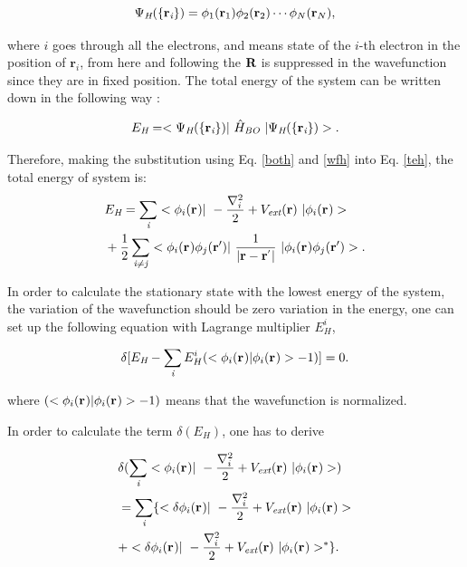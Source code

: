 \documentclass[a4paper, 12pt, titlepage,oneside,drop]{kthesis}
\begin{document}
\begin{equation}\label{wfh}
\wfh = \bwf<1><1> \bwf<2><2> \cdots \bwf<N><N>, 
\end{equation}

where $i$ goes through all the electrons, and  means state of the $i$-th electron in the position of ${\textbf{r}}_{\textit{i}}$, 
from here and following the $\textbf R$ is suppressed in the wavefunction since they are in fixed position. The total energy of the system can be written down 
in the following way :

\begin{equation}\label{teh}
E_{\textit{H}} = <\Psi_{{\textit H}}(\{ {\textbf r}_{{\textit i}}\}) |\ {\hat{H}}_{\textit{BO}} \ | \Psi_{{\textit H}}(\{ {\textbf r}_{{\textit i}}\})  >.
\end{equation}

Therefore, making the substitution using Eq. \ref{both} and \ref{wfh} into Eq. \ref{teh}, the total energy of system is:
\begin{equation}\begin{split}
&E_\textit{H} = \sumi<i> <\bwf<i><> |\ -\frac{\nabla^{2}_{i}}{2} + V_\textit{ext}(\textbf{r})  \ | \bwf<i><> > \\
& +\frac{1}{2} \suminj<i><j> <\bwf<i><> \bwfn<j><'>|\ \frac{1}{|\textbf{r} - \textbf{r}^{'} |} \ | \bwf<i><> \bwfn<j><'>>.
\end{split}\end{equation}

In order to calculate the stationary state with the lowest energy of the system, the variation of the wavefunction should be
zero variation in the energy, one can set up the following equation with Lagrange multiplier $E^{i}_H$,

\begin{equation}\label{haa}
 \delta [ E_{\textit{H}} - \sumi<i> E^{i}_{H} (<\bwf<i><> | \bwf<i><> > -1)] = 0. 
\end{equation}

where $(<\bwf<i><> | \bwf<i><> > -1)$ means that the wavefunction is normalized.

In order to calculate the term $\delta ( E_{\textit{H}} ) $, one has to derive

\begin{equation}\begin{split}\label{hartree1}
& \delta ( \sumi<i> <\bwf<i><> |\ -\frac{\nabla^{2}_{ i}}{2} + V_\textit{ext}(\textbf{r})  \ | \bwf<i><> > ) \\
&  = \sumi<i> \{ < \delta \bwf<i><> |\ -\frac{\nabla^{2}_{i}}{2} + V_\textit{ext}(\textbf{r})  \ | \bwf<i><> >  \\
&  + <  \delta \bwf<i><> |\ -\frac{\nabla^{2}_{i}}{2} + V_\textit{ext}(\textbf{r})  \ |  \bwf<i><> >^{\ast} \}.
\end{split}\end{equation}
\end{document}
